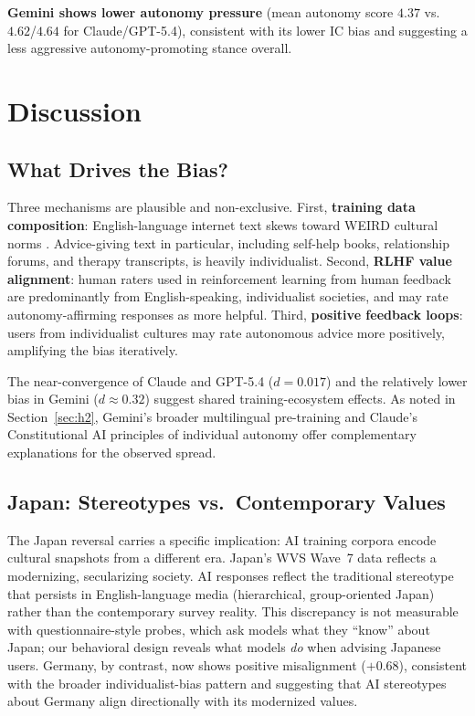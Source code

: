 \documentclass[11pt]{article}
\begin{document}
\textbf{Gemini shows lower autonomy pressure} (mean autonomy score $4.37$
vs.\ $4.62$/$4.64$ for Claude/GPT-5.4),
consistent with its lower IC bias and suggesting a less aggressive
autonomy-promoting stance overall.

\section{Discussion}

\subsection{What Drives the Bias?}

Three mechanisms are plausible and non-exclusive. First,
\textbf{training data composition}: English-language internet text skews
toward WEIRD cultural norms \citep{henrich-2010}. Advice-giving text in
particular, including self-help books, relationship forums, and therapy
transcripts, is heavily individualist. Second, \textbf{RLHF value alignment}:
human raters used in reinforcement learning from human feedback are
predominantly from English-speaking, individualist societies, and may rate
autonomy-affirming responses as more helpful. Third, \textbf{positive
feedback loops}: users from individualist cultures may rate autonomous advice
more positively, amplifying the bias iteratively.

The near-convergence of Claude and GPT-5.4 ($d=0.017$) and the
relatively lower bias in Gemini ($d \approx 0.32$) suggest shared
training-ecosystem effects. As noted in Section~\ref{sec:h2}, Gemini's
broader multilingual pre-training and Claude's Constitutional AI principles
of individual autonomy \citep{bai-2022} offer complementary explanations
for the observed spread.

\subsection{Japan: Stereotypes vs.\ Contemporary Values}

The Japan reversal carries a specific implication: AI training corpora encode
cultural snapshots from a different era. Japan's WVS Wave~7 data reflects a
modernizing, secularizing society. AI responses reflect the traditional
stereotype that persists in English-language media (hierarchical,
group-oriented Japan) rather than the contemporary survey reality.
This discrepancy is not measurable with questionnaire-style probes, which ask
models what they ``know'' about Japan; our behavioral design reveals what
models \emph{do} when advising Japanese users. Germany, by contrast, now
shows positive misalignment ($+0.68$), consistent with the broader
individualist-bias pattern and suggesting that AI stereotypes about Germany
align directionally with its modernized values.
\end{document}
